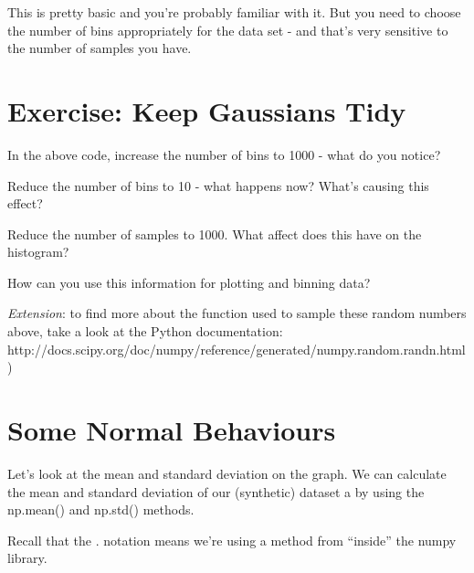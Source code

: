 \documentclass[
  letterpaper,
  DIV=11,
  numbers=noendperiod]{scrreprt}
\begin{document}
This is pretty basic and you're probably familiar with it. But you need
to choose the number of bins appropriately for the data set - and that's
very sensitive to the number of samples you have.


\hypertarget{exercise-keep-gaussians-tidy}{%
\chapter{Exercise: Keep Gaussians
Tidy}\label{exercise-keep-gaussians-tidy}}

In the above code, increase the number of bins to 1000 - what do you
notice?

Reduce the number of bins to 10 - what happens now? What's causing this
effect?

Reduce the number of samples to 1000. What affect does this have on the
histogram?

How can you use this information for plotting and binning data?

\emph{Extension}: to find more about the function used to sample these
random numbers above, take a look at the Python documentation:
http://docs.scipy.org/doc/numpy/reference/generated/numpy.random.randn.html)


\hypertarget{some-normal-behaviours}{%
\chapter{Some Normal Behaviours}\label{some-normal-behaviours}}

Let's look at the mean and standard deviation on the graph. We can
calculate the mean and standard deviation of our (synthetic) dataset a
by using the np.mean() and np.std() methods.

Recall that the . notation means we're using a method from ``inside''
the numpy library.
\end{document}
